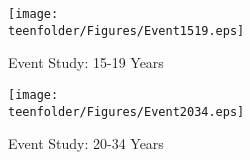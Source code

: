 \begin{figure}[htpb!]
\begin{center}
\caption{Event Study: 15-19 Years}
\vspace{-5mm}
\label{TEENfig:Event1519}
\texttt{[image: \\teenfolder/Figures/Event1519.eps]} 
\end{center}
\end{figure}

\begin{figure}[htpb!]
\begin{center}
\caption{Event Study: 20-34 Years}
\vspace{-5mm}
\label{TEENfig:Event2034}
\texttt{[image: \\teenfolder/Figures/Event2034.eps]} 
\end{center}
\end{figure}
